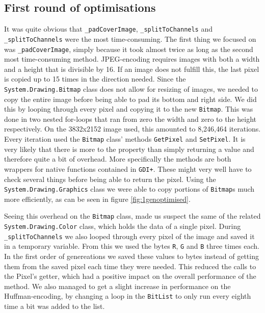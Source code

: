 \subsection{First round of optimisations}
It was quite obvious that \lstinline|_padCoverImage|, \lstinline|_splitToChannels| and \lstinline|_splitToChannels| were the most time-consuming.
The first thing we focused on was \lstinline|_padCoverImage|, simply because it took almost twice as long as the second most time-consuming method.
JPEG-encoding requires images with both a width and a height that is divisible by 16.
If an image does not fulfill this, the last pixel is copied up to 15 times in the direction needed.
Since the \lstinline|System.Drawing.Bitmap| class does not allow for resizing of images, we needed to copy the entire image before being able to pad its bottom and right side.
We did this by looping through every pixel and copying it to the new \lstinline|Bitmap|.
This was done in two nested for-loops that ran from zero the width and zero to the height respectively.
On the 3832x2152 image used, this amounted to 8,246,464 iterations.
Every iteration used the \lstinline|Bitmap| class' methods \lstinline|GetPixel| and \lstinline|SetPixel|.
It is very likely that there is more to the property than simply returning a value and therefore quite a bit of overhead.
More specifically the methods are both wrappers for native functions contained in \lstinline|GDI+|. 
These might very well have to check several things before being able to return the pixel.
Using the \lstinline|System.Drawing.Graphics| class we were able to copy portions of \lstinline|Bitmap|s much more efficiently, \citep{MSDNBitmap} as can be seen in figure \ref{fig:1genoptimised}.

Seeing this overhead on the \lstinline|Bitmap| class, made us suspect the same of the related \lstinline|System.Drawing.Color| class, which holds the data of a single pixel.
During \lstinline|_splitToChannels| we also looped through every pixel of the image and saved it in a temporary variable. 
From this we used the bytes \lstinline|R|, \lstinline|G| and \lstinline|B| three times each. 
In the first order of genereations we saved these values to bytes instead of getting them from the saved pixel each time they were needed.
This reduced the calls to the Pixel's getter, which had a positive impact on the overall performance of the method.
We also managed to get a slight increase in performance on the Huffman-encoding, by changing a loop in the \lstinline|BitList| to only run every eighth time a bit was added to the list.


